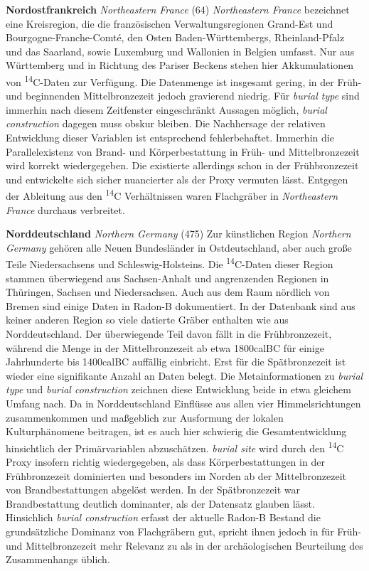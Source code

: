 \documentclass[openany,twoside,twocolumn]{book}
\begin{document}
\textbf{Nordostfrankreich} \emph{Northeastern France} (64) \newline 
\emph{Northeastern France} bezeichnet eine Kreisregion, die die französischen Verwaltungsregionen Grand-Est und Bourgogne-Franche-Comté, den Osten Baden-Württembergs, Rheinland-Pfalz und das Saarland, sowie Luxemburg und Wallonien in Belgien umfasst. Nur aus Württemberg und in Richtung des Pariser Beckens stehen hier Akkumulationen von \textsuperscript{14}C-Daten zur Verfügung. Die Datenmenge ist insgesamt gering, in der Früh- und beginnenden Mittelbronzezeit jedoch gravierend niedrig. Für \emph{burial type} sind immerhin nach diesem Zeitfenster eingeschränkt Aussagen möglich, \emph{burial construction} dagegen muss obskur bleiben. Die Nachhersage der relativen Entwicklung dieser Variablen ist entsprechend fehlerbehaftet. Immerhin die Parallelexistenz von Brand- und Körperbestattung in Früh- und Mittelbronzezeit wird korrekt wiedergegeben. Die existierte allerdings schon in der Frühbronzezeit und entwickelte sich sicher nuancierter als der Proxy vermuten lässt. Entgegen der Ableitung aus den \textsuperscript{14}C Verhältnissen waren Flachgräber in \emph{Northeastern France} durchaus verbreitet.

\textbf{Norddeutschland} \emph{Northern Germany} (475) \newline 
Zur künstlichen Region \emph{Northern Germany} gehören alle Neuen Bundesländer in Ostdeutschland, aber auch große Teile Niedersachsens und Schleswig-Holsteins. Die \textsuperscript{14}C-Daten dieser Region stammen überwiegend aus Sachsen-Anhalt und angrenzenden Regionen in Thüringen, Sachsen und Niedersachsen. Auch aus dem Raum nördlich von Bremen sind einige Daten in Radon-B dokumentiert. In der Datenbank sind aus keiner anderen Region so viele datierte Gräber enthalten wie aus Norddeutschland. Der überwiegende Teil davon fällt in die Frühbronzezeit, während die Menge in der Mittelbronzezeit ab etwa 1800calBC für einige Jahrhunderte bis 1400calBC auffällig einbricht. Erst für die Spätbronzezeit ist wieder eine signifikante Anzahl an Daten belegt. Die Metainformationen zu \emph{burial type} und \emph{burial construction} zeichnen diese Entwicklung beide in etwa gleichem Umfang nach. Da in Norddeutschland Einflüsse aus allen vier Himmelsrichtungen zusammenkommen und maßgeblich zur Ausformung der lokalen Kulturphänomene beitragen, ist es auch hier schwierig die Gesamtentwicklung hinsichtlich der Primärvariablen abzuschätzen. \emph{burial site} wird durch den \textsuperscript{14}C Proxy insofern richtig wiedergegeben, als dass Körperbestattungen in der Frühbronzezeit dominierten und besonders im Norden ab der Mittelbronzezeit von Brandbestattungen abgelöst werden. In der Spätbronzezeit war Brandbestattung deutlich dominanter, als der Datensatz glauben lässt. Hinsichlich \emph{burial construction} erfasst der aktuelle Radon-B Bestand die grundsätzliche Dominanz von Flachgräbern gut, spricht ihnen jedoch in für Früh- und Mittelbronzezeit mehr Relevanz zu als in der archäologischen Beurteilung des Zusammenhangs üblich.
\end{document}
